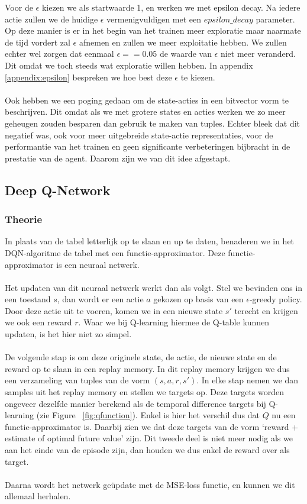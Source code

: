 \documentclass[11pt]{article}
\begin{document}
Voor de $\epsilon$ kiezen we als startwaarde 1, en werken we met epsilon decay. Na iedere actie zullen we de huidige $\epsilon$ vermenigvuldigen met een $epsilon\_decay$ parameter. Op deze manier is er in het begin van het trainen meer exploratie maar naarmate de tijd vordert zal $\epsilon$ afnemen en zullen we meer exploitatie hebben. We zullen echter wel zorgen dat eenmaal $\epsilon == 0.05$ de waarde van $\epsilon$ niet meer veranderd. Dit omdat we toch steeds wat exploratie willen hebben. In appendix \ref{appendix:epsilon} bespreken we hoe best deze $\epsilon$ te kiezen.\\\\
Ook hebben we een poging gedaan om de state-acties in een bitvector vorm te beschrijven. Dit omdat als we met grotere states en acties werken we zo meer geheugen zouden besparen dan gebruik te maken van tuples. Echter bleek dat dit negatief was, ook voor meer uitgebreide state-actie representaties, voor de performantie van het trainen en geen significante verbeteringen bijbracht in de prestatie van de agent. Daarom zijn we van dit idee afgestapt.\\

\subsection{Deep Q-Network}
\subsubsection{Theorie}
In plaats van de tabel letterlijk op te slaan en up te daten, benaderen we in het DQN-algoritme de tabel met een functie-approximator. Deze functie-approximator is een neuraal netwerk.\\\\
Het updaten van dit neuraal netwerk werkt dan als volgt. Stel we bevinden ons in een toestand $s$, dan wordt er een actie $a$ gekozen op basis van een $\epsilon$-greedy policy. Door deze actie uit te voeren, komen we in een nieuwe state $s'$ terecht en krijgen we ook een reward $r$. Waar we bij Q-learning hiermee de Q-table kunnen updaten, is het hier niet zo simpel. \\\\
De volgende stap is om deze originele state, de actie, de nieuwe state en de reward op te slaan in een replay memory. In dit replay memory krijgen we dus een verzameling van tuples van de vorm $(s,a,r,s')$. In elke stap nemen we dan samples uit het replay memory en stellen we targets op. Deze targets worden ongeveer dezelfde manier berekend als de temporal difference targets bij Q-learning (zie Figure ~\ref{fig:qfunction}). Enkel is hier het verschil dus dat $Q$ nu een functie-approximator is. Daarbij zien we dat deze targets van de vorm `reward + estimate of optimal future value' zijn. Dit tweede deel is niet meer nodig als we aan het einde van de episode zijn, dan houden we dus enkel de reward over als target. \\\\
Daarna wordt het netwerk geüpdate met de MSE-loss functie, en kunnen we dit allemaal herhalen.\\
\end{document}
